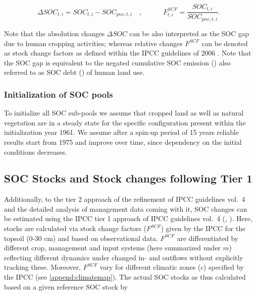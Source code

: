 \documentclass[gc, manuscript]{copernicus}
\begin{document}
\begin{equation}
\Delta SOC_{t, i} = SOC_{t, i} - SOC_{pnv, t, i}\quad, \qquad \quad  F^{SCF}_{t, i} = \frac{SOC_{t, i}}{SOC_{pnv, t, i}}.
\label{eq:stockdiff}
\end{equation}

Note that the absolution changes \(\Delta SOC\) can be also interpreted as the SOC gap due to human cropping activities; whereas relative changes \(F^{SCF}\) can be denoted as stock change factors as defined within the IPCC guidelines of 2006 \citep{ipcc_2006_2006}. Note that the SOC gap is equivalent to the negated cumulative SOC emission (\citep{pugh_simulated_2015}) also referred to as SOC debt (\citep{sanderman_soil_2017}) of human land use.

\hypertarget{initialization-of-soc-pools}{%
\subsubsection{Initialization of SOC pools}\label{initialization-of-soc-pools}}

To initialize all SOC sub-pools we assume that cropped land as well as natural vegetation are in a steady state for the specific configuration present within the initialization year 1961. We assume after a spin-up period of 15 years reliable results start from 1975 and improve over time, since dependency on the initial conditions decreases.

\hypertarget{sec:tier1}{%
\subsection{SOC Stocks and Stock changes following Tier 1}\label{sec:tier1}}

Additionally, to the tier 2 approach of the refinement of IPCC guidelines vol.~4 \citep{ipcc_2019_2019} and the detailed analysis of management data coming with it, SOC changes can be estimated using the IPCC tier 1 approach of IPCC guidelines vol.~4 (\citet{ipcc_2006_2006}, \citet{ipcc_2019_2019}). Here, stocks are calculated via stock change factors (\(F^{SCF}\)) given by the IPCC for the topsoil (0-30 cm) and based on observational data. \(F^{SCF}\) are differentiated by different crop, management and input systems (here summarized under \(m\)) reflecting different dynamics under changed in- and outflows without explicitly tracking these. Moreover, \(F^{SCF}\) vary for different climatic zones (\(c\)) specified by the IPCC (see \ref{append:climatemap}). The actual SOC stocks as thus calculated based on a given reference SOC stock by
\end{document}
